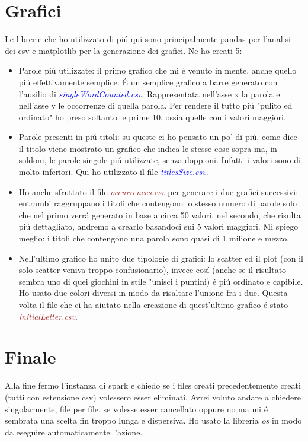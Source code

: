 \documentclass[12pt,a4paper]{article}
\begin{document}
    \section{Grafici}
    Le librerie che ho utilizzato di piú qui sono principalmente pandas per l'analisi dei csv e matplotlib per la generazione dei grafici.
    Ne ho creati 5:
    \begin{itemize}
        \item Parole piú utilizzate: il primo grafico che mi é venuto in mente, anche quello piú effettivamente semplice. É un semplice grafico a barre generato con l'ausilio di \textit{\textcolor{blue}{singleWordCounted.csv}}. Rappresentata nell'asse x la parola e nell'asse y le occorrenze di quella parola.
        Per rendere il tutto piú "pulito ed ordinato" ho preso soltanto le prime 10, ossia quelle con i valori maggiori.
        \item Parole presenti in piú titoli: su queste ci ho pensato un po' di piú, come dice il titolo viene mostrato un grafico che indica le stesse cose sopra ma, in soldoni, le parole singole piú utilizzate, senza doppioni. Infatti i valori sono di molto inferiori. Qui ho utilizzato il file \textit{\textcolor{blue}{titlesSize.csv}}.
        \item Ho anche sfruttato il file \textit{\textcolor{brown}{occurrences.csv}} per generare i due grafici successivi: entrambi raggruppano i titoli che contengono lo stesso numero di parole solo che nel primo verrá generato in base a circa 50 valori, nel secondo, che risulta piú dettagliato, andremo a crearlo basandoci sui 5 valori maggiori.
        Mi spiego meglio: i titoli che contengono una parola sono quasi di 1 milione e mezzo.
        \item Nell'ultimo grafico ho unito due tipologie di grafici: lo scatter ed il plot (con il solo scatter veniva troppo confusionario), invece cosí (anche se il risultato sembra uno di quei giochini in stile "unisci i puntini) é piú ordinato e capibile. Ho usato due colori diversi in modo da risaltare l'unione fra i due.
        Questa volta il file che ci ha aiutato nella creazione di quest'ultimo grafico é stato \textit{\textcolor{brown}{initialLetter.csv}}.
        \end{itemize}
    \section{Finale}
    Alla fine fermo l'instanza di spark e chiedo se i files creati precedentemente creati (tutti con estensione csv) volessero esser eliminati. Avrei voluto andare a chiedere singolarmente, file per file, se volesse esser cancellato oppure no ma mi é sembrata una scelta fin troppo lunga e dispersiva. Ho usato la libreria \textit{os} in modo da eseguire automaticamente l'azione.
\end{document}
